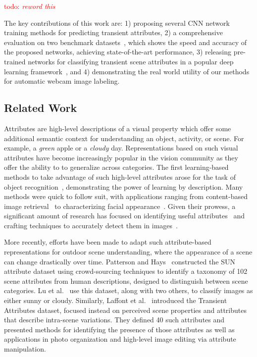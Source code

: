 \documentclass[10pt,twocolumn,letterpaper]{article}
\newcommand{\todo}[1]{\textcolor{red}{todo: {\em #1}}}
\begin{document}

\todo{reword this}

The key contributions of this work are: 1) proposing several CNN network
training methods for predicting transient attributes, 2) a comprehensive
evaluation on two benchmark datasets~\cite{lutwoclass,Laffont14}, which shows
the speed and accuracy of the proposed networks, achieving state-of-the-art
performance, 3) releasing pre-trained networks for classifying transient scene
attributes in a popular deep learning framework~\cite{caffe14}, and 4)
demonstrating the real world utility of our methods for automatic webcam image
labeling. 

\subsection{Related Work}
Attributes are high-level descriptions of a visual property which offer some
additional semantic context for understanding an object, activity, or scene.
For example, a \emph{green} apple or a \emph{cloudy} day. Representations based
on such visual attributes have become increasingly popular in the vision
community as they offer the ability to to generalize across categories. The
first learning-based methods to take advantage of such high-level attributes
arose for the task of object
recognition~\cite{farhadi2009describing,lampert2009learning}, demonstrating the
power of learning by description. Many methods were quick to follow suit, with
applications ranging from content-based image
retrieval~\cite{siddiquie2011image} to characterizing facial
appearance~\cite{kumar2011describable}. Given their prowess, a significant
amount of research has focused on identifying useful
attributes~\cite{berg2010automatic} and crafting techniques to accurately
detect them in images~\cite{vedaldi2014understanding}. 

More recently, efforts have been made to adapt such attribute-based
representations for outdoor scene understanding, where the appearance of a
scene can change drastically over time.  Patterson and
Hays~\cite{patterson2012sun} constructed the SUN attribute dataset using
crowd-sourcing techniques to identify a taxonomy of 102 scene attributes from
human descriptions, designed to distinguish between scene categories. Lu et
al.~\cite{lutwoclass} use this dataset, along with two others, to classify
images as either sunny or cloudy.  Similarly, Laffont et al.~\cite{Laffont14}
introduced the Transient Attributes dataset, focused instead on perceived scene
properties and attributes that describe intra-scene variations. They defined 40
such attributes and presented methods for identifying the presence of those
attributes as well as applications in photo organization and high-level image
editing via attribute manipulation. 
\end{document}
